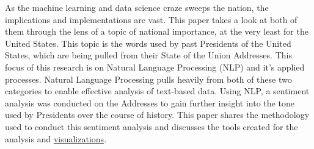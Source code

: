 As the machine learning and data science craze sweeps the nation, the implications and implementations are vast.
This paper takes a look at both of them through the lens of a topic of national importance, at the very least for the United States.
This topic is the words used by past Presidents of the United States, which are being pulled from their State of the Union Addresses.
This focus of this research is on Natural Language Processing (NLP) and it's applied processes.
Natural Language Processing pulls heavily from both of these two categories to enable effective analysis of text-based data.
Using NLP, a sentiment analysis was conducted on the Addresses to gain further insight into the tone used by Presidents over the course of history.
This paper shares the methodology used to conduct this sentiment analysis and discusses the tools created for the analysis and \href{https://turing.cs.olemiss.edu/~dcrydeen/thesis/index.html}{visualizations}.